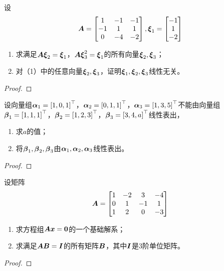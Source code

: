 \begin{problem}
设
\begin{equation*}
    \boldsymbol{A}=
    \begin{bmatrix}
        1  & -1 & -1 \\
        -1 & 1  & 1  \\
        0  & -4 & -2
    \end{bmatrix},
    \boldsymbol{\xi}_1=\begin{bmatrix}-1\\1\\-2\end{bmatrix}
\end{equation*}
\begin{enumerate}
    \item 求满足\(\boldsymbol{A}\boldsymbol{\xi}_2=\boldsymbol{\xi}_1\)，\(\boldsymbol{A}\boldsymbol{\xi}_3^2=\boldsymbol{\xi}_1\)的所有向量\(\boldsymbol{\xi}_2,\boldsymbol{\xi}_3\)；
    \item 对（1）中的任意向量\(\boldsymbol{\xi}_2,\boldsymbol{\xi}_3\)，证明\(\boldsymbol{\xi}_1,\boldsymbol{\xi}_2,\boldsymbol{\xi}_3\)线性无关。
\end{enumerate}
\end{problem}
\begin{proof}

\end{proof}

\begin{problem}
设向量组\(\boldsymbol{\alpha}_1=\left[ 1,0,1 \right]^\top\)，\(\boldsymbol{\alpha}_2=\left[ 0,1,1 \right]^\top\)，\(\boldsymbol{\alpha}_3=\left[ 1,3,5 \right]^\top\)不能由向量组\(\boldsymbol{\beta}_1=\left[ 1,1,1 \right]^\top\)，\(\boldsymbol{\beta}_2=\left[ 1,2,3 \right]^\top\)，\(\boldsymbol{\beta}_3=\left[ 3,4,a \right]^\top\)线性表出，
\begin{enumerate}
    \item 求\(a\)的值；
    \item 将\(\boldsymbol{\beta}_1,\boldsymbol{\beta}_2,\boldsymbol{\beta}_3\)由\(\boldsymbol{\alpha}_1,\boldsymbol{\alpha}_2,\boldsymbol{\alpha}_3\)线性表出。
\end{enumerate}
\end{problem}
\begin{proof}

\end{proof}

\begin{problem}
设矩阵
\begin{equation*}
    \boldsymbol{A}=
    \begin{bmatrix}
        1 & -2 & 3  & -4 \\
        0 & 1  & -1 & 1  \\
        1 & 2  & 0  & -3
    \end{bmatrix}
\end{equation*}
\begin{enumerate}
    \item 求方程组\(\boldsymbol{A}\boldsymbol{x}=\boldsymbol{0}\)的一个基础解系；
    \item 求满足\(\boldsymbol{A}\boldsymbol{B}=\boldsymbol{I}\)的所有矩阵\(\boldsymbol{B}\)，其中\(\boldsymbol{I}\)是\(3\)阶单位矩阵。
\end{enumerate}
\end{problem}
\begin{proof}

\end{proof}

